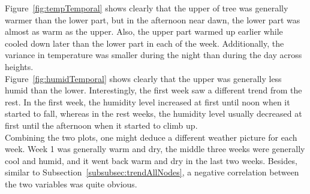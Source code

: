\documentclass[11pt]{article}
\begin{document}
Figure~\ref{fig:tempTemporal} shows clearly that the upper of tree was generally warmer than the lower part, but in the afternoon near dawn, the lower part was almost as warm as the upper. Also, the upper part warmed up earlier while cooled down later than the lower part in each of the week. Additionally, the variance in temperature was smaller during the night than during the day across heights.\\
Figure~\ref{fig:humidTemporal} shows clearly that the upper was generally less humid than the lower. Interestingly, the first week saw a different trend from the rest. In the first week, the humidity level increased at first until noon when it started to fall, whereas in the rest weeks, the humidity level usually decreased at first until the afternoon when it started to climb up.\\
Combining the two plots, one might deduce a different weather picture for each week. Week 1 was generally warm and dry, the middle three weeks were generally cool and humid, and it went back warm and dry in the last two weeks. Besides, similar to Subsection~\ref{subsubsec:trendAllNodes}, a negative correlation between the two variables was quite obvious.
\end{document}
